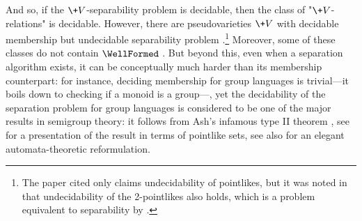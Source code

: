 And so, if the $\+V$-separability problem is decidable, then the class of "$\+V$-relations"
is decidable. However, there are pseudovarieties $\+V$ with decidable membership but 
undecidable separability problem \cite[Corollary 1.6, p.~478]{rhode_pointlike_2011}.\footnote{The paper cited only claims undecidability of pointlikes, but it was noted in \cite[\S 1, pp.~1--2]{gool_pointlike_2019} that undecidability of the 2-pointlikes also holds, which is a problem 
equivalent to separability by \cite[Proposition 3.4, p.~6]{almeida_algorithmic_1999}.}
Moreover, some of these classes do not contain $\WellFormed$ \cite[Corollary 1.7, p.~478]{rhode_pointlike_2011}. But beyond 
this, even when a separation algorithm exists, it can be conceptually much harder than its
membership counterpart: for instance, deciding membership for group languages is trivial---it boils down to checking if a monoid is a group---, yet the decidability of the 
separation problem for group languages is considered to be one of the major results in semigroup theory:
it follows from Ash's infamous type II theorem \cite[Theorem 2.1, p.~129]{ash_inevitable_1991}, see \cite[Theorem 1.1, p.~3]{henckell_ashs_1991} for a presentation of the result in terms of pointlike sets, see also \cite[\S III, Theorem 8, p.~5]{place_group_2023} for an elegant automata-theoretic reformulation.

